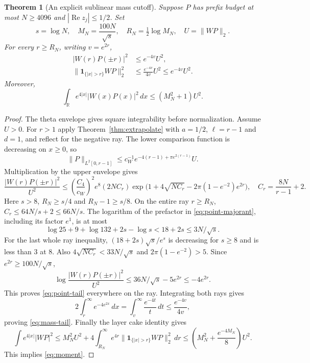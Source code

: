 \documentclass[11pt]{article}
\newtheorem{theorem}{Theorem}[section]
\theoremstyle{remark}
\newcommand{\R}{\mathbb R}
\newcommand{\norm}[1]{\lVert #1\rVert}
\newcommand{\one}{\mathbf 1}
\newcommand{\Rea}{\operatorname{Re}}
\begin{document}
\begin{theorem}[An explicit sublinear mass cutoff]\label{thm:tail}
Suppose $P$ has prefix budget at most $N\ge4096$ and
$|\Rea z_j|\le1/2$. Set
\begin{equation}\label{eq:cutoff}
 s=\log N,\quad M_N=\frac{100N}{\sqrt s},\quad
 R_N=\tfrac12\log M_N,\quad U=\norm{WP}_2.
\end{equation}
For every $r\ge R_N$, writing $v=e^{2r}$,
\begin{align}
 |W(r)P(\pm r)|^2&\le e^{-4v}U^2,\label{eq:point-tail}\\
 \norm{\one_{\{|x|>r\}}WP}_2^2
     &\le\frac{e^{-4v}}{4v}U^2\le e^{-4v}U^2.\label{eq:mass-tail}
\end{align}
Moreover,
\begin{equation}\label{eq:moment}
 \int_\R e^{4|x|}|W(x)P(x)|^2\,dx\le(M_N^2+1)U^2.
\end{equation}
\end{theorem}
\begin{proof}
The theta envelope gives square integrability before normalization.
Assume $U>0$. For $r>1$ apply Theorem~\ref{thm:extrapolate} with
$a=1/2$, $\ell=r-1$ and $d=1$, and reflect for the negative ray.
The lower comparison function is decreasing on $x\ge0$, so
\[
 \norm P_{L^2[0,r-1]}
       \le c_W^{-1}e^{-4(r-1)+\pi e^{2(r-1)}}U.
\]
Multiplication by the upper envelope gives
\begin{equation}\label{eq:point-majorant}
 \frac{|W(r)P(\pm r)|^2}{U^2}
 \le\left(\frac{C_4}{c_W}\right)^2e^8(2NC_r)
  \exp\bigl(1+4\sqrt{NC_r}-2\pi(1-e^{-2})e^{2r}\bigr),
 \quad C_r=\frac{8N}{r-1}+2.
\end{equation}
Here $s>8$, $R_N\ge s/4$ and $R_N-1\ge s/8$.
On the entire ray $r\ge R_N$, $C_r\le64N/s+2\le66N/s$.
The logarithm of the prefactor in \eqref{eq:point-majorant}, including
its factor $e^1$, is at most
\[
 \log25+9+\log132+2s-\log s<18+2s\le3N/\sqrt s.
\]
For the last whole ray inequality,
$(18+2s)\sqrt s/e^s$ is decreasing for $s\ge8$ and is less than $3$ at $8$.
Also $4\sqrt{NC_r}<33N/\sqrt s$ and $2\pi(1-e^{-2})>5$.
Since $e^{2r}\ge100N/\sqrt s$,
\[
 \log\frac{|W(r)P(\pm r)|^2}{U^2}
       \le36N/\sqrt s-5e^{2r}\le-4e^{2r}.
\]
This proves \eqref{eq:point-tail} everywhere on the ray.
Integrating both rays gives
\[
 2\int_r^\infty e^{-4e^{2x}}\,dx
       =\int_v^\infty\frac{e^{-4t}}t\,dt\le\frac{e^{-4v}}{4v},
\]
proving \eqref{eq:mass-tail}.
Finally the layer cake identity gives
\[
 \int e^{4|x|}|WP|^2
 \le M_N^2U^2+4\int_{R_N}^\infty
              e^{4r}\norm{\one_{\{|x|>r\}}WP}_2^2\,dr
 \le\left(M_N^2+\frac{e^{-4M_N}}8\right)U^2.
\]
This implies \eqref{eq:moment}.
\end{proof}
\end{document}
